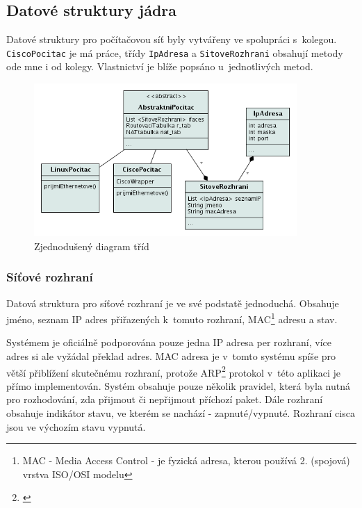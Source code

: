 \subsection{Datové struktury jádra}
Datové struktury pro počítačovou síť byly vytvářeny ve spolupráci s~kolegou. \verb|CiscoPocitac| je má práce, třídy \verb|IpAdresa| a \verb|SitoveRozhrani| obsahují metody ode mne i od kolegy. Vlastnictví je blíže popsáno u~jednotlivých metod.

\begin{figure}[h]
\begin{center}
\includegraphics[width=10cm]{figures/uml_class}
\caption{Zjednodušený diagram tříd}
\label{uml:class}
\end{center}
\end{figure}


\subsubsection{Síťové rozhraní}
Datová struktura pro síťové rozhraní je ve své podstatě jednoduchá. Obsahuje jméno, seznam IP adres přiřazených k~tomuto rozhraní, MAC\footnote{MAC - Media Access Control - je fyzická adresa, kterou používá 2. (spojová) vrstva ISO/OSI modelu} adresu a stav.

Systémem je oficiálně podporována pouze jedna IP adresa per rozhraní, více adres si ale vyžádal překlad adres. MAC adresa je v~tomto systému spíše pro větší přiblížení skutečnému rozhraní, protože ARP\footnote{\cite{wiki:arp}} protokol v~této aplikaci je přímo implementován. Systém obsahuje pouze několik pravidel, která byla nutná pro rozhodování, zda přijmout či nepřijmout příchozí paket. Dále rozhraní obsahuje indikátor stavu, ve kterém se nachází - zapnuté/vypnuté. Rozhraní cisca jsou ve výchozím stavu vypnutá.

